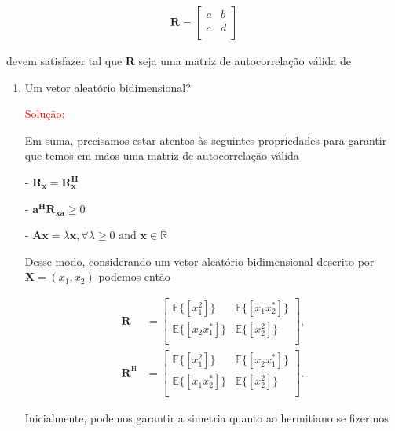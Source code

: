 \documentclass[a4paper,10pt]{article}
\begin{document}
\begin{enumerate}
				\begin{align}
					\mathbf{R} = \left[
					\begin{matrix}
						a & b  \\
						c & d  \\
					\end{matrix} \right]
				\end{align}
				
				devem satisfazer tal que $\mathbf{R}$ seja uma matriz de autocorrelação válida de
			
				\begin{enumerate}
					
					\item Um vetor aleatório bidimensional?
					
						\textcolor{red}{Solução:}
						
						Em suma, precisamos estar atentos às seguintes propriedades para garantir que temos em mãos uma matriz de autocorrelação válida
						
						
						- $\mathbf{R_{x}} = \mathbf{R^{H}_{x}}$
						
						- $\mathbf{a^{H}} \mathbf{R_{xa}} \geq 0$
						
						- $\mathbf{Ax} = \lambda \mathbf{x}, \forall \lambda \geq 0 \text{ and } \mathbf{x} \in \mathbb{R}$
						
						Desse modo, considerando um vetor aleatório bidimensional descrito por $\mathbf{X} = (x_{1},x_{2})$ podemos então
						
						\begin{align}
							\mathbf{R} &= \left[ 
							\begin{matrix}
								\mathbb{E}\{[x^{2}_{1}]\} & \mathbb{E}\{[x_{1}x^{*}_{2}]\} \\
								\mathbb{E}\{[x_{2}x^{*}_{1}]\} & \mathbb{E}\{[x^{2}_{2}]\} \\
							\end{matrix} \right], \\
							\mathbf{R}^{\text{H}} &= \left[ 
							\begin{matrix}
								\mathbb{E}\{[x^{2}_{1}]\} & \mathbb{E}\{[x_{2}x^{*}_{1}]\} \\
								\mathbb{E}\{[x_{1}x^{*}_{2}]\} & \mathbb{E}\{[x^{2}_{2}]\} \\
							\end{matrix} \right].
						\end{align}
						
						Inicialmente, podemos garantir a simetria quanto ao hermitiano se fizermos 
						

\end{enumerate}
\end{enumerate}
\end{document}
